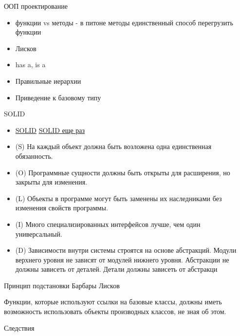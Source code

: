 \documentclass{article}
\begin{document}
\LARGE

\begin{center} ООП проектирование  \end{center}
\begin{itemize}
    \item функции vs методы - в питоне методы единственный способ перегрузить функции
    \item Лисков
    \item has a, is a
    \item Правильные иерархии
    \item Приведение к базовому типу
\end{itemize}
\newpage

\begin{center} SOLID \end{center}
\begin{itemize}
	\item 	\href{http://ru.wikipedia.org/wiki/SOLID_(%D0%BE%D0%B1%D1%8A%D0%B5%D0%BA%D1%82%D0%BD%D0%BE-%D0%BE%D1%80%D0%B8%D0%B5%D0%BD%D1%82%D0%B8%D1%80%D0%BE%D0%B2%D0%B0%D0%BD%D0%BD%D0%BE%D0%B5_%D0%BF%D1%80%D0%BE%D0%B3%D1%80%D0%B0%D0%BC%D0%BC%D0%B8%D1%80%D0%BE%D0%B2%D0%B0%D0%BD%D0%B8%D0%B5)}{SOLID}
    	\href{http://blog.byndyu.ru/2009/10/solid.html}{SOLID еще раз}
    \item (S) На каждый объект должна быть возложена одна единственная обязанность.
    \item (O) Программные сущности должны быть открыты для расширения, но закрыты для изменения.
    \item (L) Объекты в программе могут быть заменены их наследниками без изменения свойств программы. 
    \item (I) Много специализированных интерфейсов лучше, чем один универсальный.
    \item (D) Зависимости внутри системы строятся на основе абстракций. 
    		  Модули верхнего уровня не зависят от модулей нижнего уровня. Абстракции не должны
    		  зависеть от деталей. Детали должны зависеть от абстракци
\end{itemize}
\newpage

\begin{center} Принцип подстановки Барбары Лисков \end{center}
    Функции, которые используют ссылки на базовые классы, должны 
    иметь возможность использовать объекты производных классов, не зная об этом.
\begin{center} Следствия \end{center}
\end{document}
